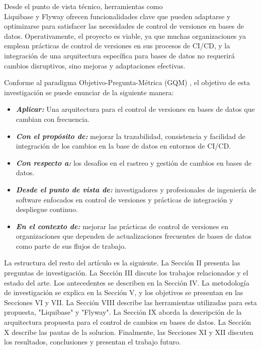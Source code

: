 \documentclass{IEEEtran}
\begin{document}
Desde el punto de vista técnico, herramientas como \\Liquibase y Flyway ofrecen funcionalidades clave que pueden adaptarse y optimizarse para satisfacer las necesidades de control de versiones en bases de datos. Operativamente, el proyecto es viable, ya que muchas organizaciones ya emplean prácticas de control de versiones en sus procesos de CI/CD, y la integración de una arquitectura específica para bases de datos no requerirá cambios disruptivos, sino mejoras y adaptaciones efectivas.

Conforme al paradigma Objetivo-Pregunta-Métrica (GQM) \cite{Basili1992}, el objetivo de esta investigación se puede enunciar de la siguiente manera:

\begin{itemize}
    \item[] {\textbf{\textit{Aplicar:}}} Una arquitectura para el control de versiones en bases de datos que cambian con frecuencia.
    \item[] {\textbf{\textit{Con el propósito de:}}} mejorar la trazabilidad, consistencia y facilidad de integración de los cambios en la base de datos en entornos de CI/CD.
    \item[] {\textbf{\textit{Con respecto a:}}} los desafíos en el rastreo y gestión de cambios en bases de datos.
    \item[] {\textbf{\textit{Desde el punto de vista de:}}} investigadores y profesionales de ingeniería de software enfocados en control de versiones y prácticas de integración y despliegue continuo.
    \item[] {\textbf{\textit{En el contexto de:}}} mejorar las prácticas de control de versiones en organizaciones que dependen de actualizaciones frecuentes de bases de datos como parte de sus flujos de trabajo.
\end{itemize}


\vspace{0.5cm}
La estructura del resto del artículo es la siguiente. La Sección II presenta las preguntas de investigación. La Sección III discute los trabajos relacionados y el estado del arte. Los antecedentes se describen en la Sección IV. La metodología de investigación se explica en la Sección V, y los objetivos se presentan en las Secciones VI y VII. La Sección VIII describe las herramientas utilizadas para esta propuesta, "Liquibase" y "Flyway". La Sección IX aborda la descripción de la arquitectura propuesta para el control de cambios en bases de datos. La Sección X describe las pautas de la solucion. Finalmente, las Secciones XI y XII discuten los resultados, conclusiones y presentan el trabajo futuro.
\end{document}

